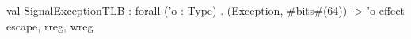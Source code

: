 val SignalExceptionTLB : forall ('o : Type) . (Exception, #\hyperref[zbits]{bits}#(64)) -> 'o effect {escape, rreg, wreg}
